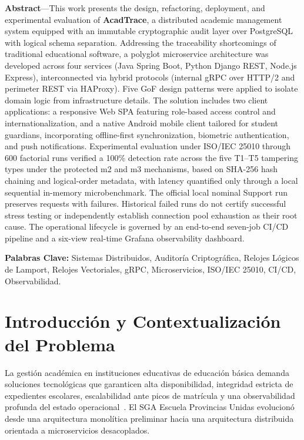 \documentclass[11pt,a4paper]{article}
\begin{document}
\vspace{0.4cm}
\noindent\textbf{Abstract}---This work presents the design, refactoring, deployment, and experimental evaluation of \textbf{AcadTrace}, a distributed academic management system equipped with an immutable cryptographic audit layer over PostgreSQL with logical schema separation. Addressing the traceability shortcomings of traditional educational software, a polyglot microservice architecture was developed across four services (Java Spring Boot, Python Django REST, Node.js Express), interconnected via hybrid protocols (internal gRPC over HTTP/2 and perimeter REST via HAProxy). Five GoF design patterns were applied to isolate domain logic from infrastructure details. The solution includes two client applications: a responsive Web SPA featuring role-based access control and internationalization, and a native Android mobile client tailored for student guardians, incorporating offline-first synchronization, biometric authentication, and push notifications. Experimental evaluation under ISO/IEC 25010 through 600 factorial runs verified a 100\% detection rate across the five T1--T5 tampering types under the protected m2 and m3 mechanisms, based on SHA-256 hash chaining and logical-order metadata, with latency quantified only through a local sequential in-memory microbenchmark. The official local nominal Support run preserves \CargaPeticiones{} requests with \CargaFallos{} failures. Historical failed runs do not certify successful stress testing or independently establish connection pool exhaustion as their root cause. The operational lifecycle is governed by an end-to-end seven-job CI/CD pipeline and a six-view real-time Grafana observability dashboard.\par

\vspace{0.3cm}
\noindent\textbf{Palabras Clave:} Sistemas Distribuidos, Auditor\'ia Criptogr\'afica, Relojes L\'ogicos de Lamport, Relojes Vectoriales, gRPC, Microservicios, ISO/IEC 25010, CI/CD, Observabilidad.

\newpage

\section{Introducci\'on y Contextualizaci\'on del Problema}
\label{sec:introduccion}
La gesti\'on acad\'emica en instituciones educativas de educaci\'on b\'asica demanda soluciones tecnol\'ogicas que garanticen alta disponibilidad, integridad estricta de expedientes escolares, escalabilidad ante picos de matr\'icula y una observabilidad profunda del estado operacional~\cite{newman2021microservices,burns2025designing}. El SGA Escuela Provincias Unidas evolucion\'o desde una arquitectura monol\'itica preliminar hacia una arquitectura distribuida orientada a microservicios desacoplados.
\end{document}

